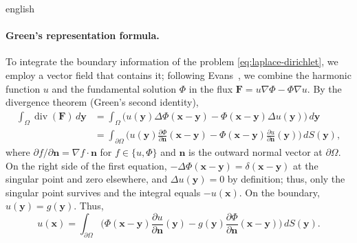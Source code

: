\documentclass[../0000.tex]{subfiles}
\begin{document}
\begin{hyphenrules}{english}
\paragraph{Green's representation formula.}
To integrate the boundary information of the problem \eqref{eq:laplace-dirichlet}, we employ a vector
field that contains
it; following Evans~\cite{evans2010}, we combine the harmonic function $u$ and the fundamental solution
$\Phi$ in the flux $\mathbf{F}=u\nabla\Phi-\Phi\nabla u$. By the divergence theorem (Green's second identity),
\begin{align}
  \int_\Omega\operatorname{div}(\mathbf{F})\,d\mathbf{y}
    &=\int_\Omega\big(u(\mathbf{y})\Delta\Phi(\mathbf{x}-\mathbf{y})-\Phi(\mathbf{x}-\mathbf{y})\Delta u(\mathbf{y})\big)\,d\mathbf{y} \label{eq:green2-a}\\
    &=\int_{\partial\Omega}\Big(u(\mathbf{y})\frac{\partial\Phi}{\partial\mathbf{n}}(\mathbf{x}-\mathbf{y})
      -\Phi(\mathbf{x}-\mathbf{y})\frac{\partial u}{\partial\mathbf{n}}(\mathbf{y})\Big)\,d S(\mathbf{y}), \label{eq:green2-b}
\end{align}
where $\partial f/\partial\mathbf{n}=\nabla f\cdot\mathbf{n}$ for $f\in\{u,\Phi\}$ and $\mathbf{n}$ is the outward normal vector
at $\partial\Omega$. On the right side of the first equation, $-\Delta\Phi(\mathbf{x}-\mathbf{y})=\delta(\mathbf{x}-\mathbf{y})$ at the
singular point and zero elsewhere, and $\Delta u(\mathbf{y})=0$ by definition; thus, only the singular point
survives and the integral equals $-u(\mathbf{x})$. On the boundary, $u(\mathbf{y})=g(\mathbf{y})$. Thus,
\begin{equation}
  u(\mathbf{x})=\int_{\partial\Omega}\Big(\Phi(\mathbf{x}-\mathbf{y})\frac{\partial u}{\partial\mathbf{n}}(\mathbf{y})
    -g(\mathbf{y})\frac{\partial\Phi}{\partial\mathbf{n}}(\mathbf{x}-\mathbf{y})\Big)\,d S(\mathbf{y}).
  \label{eq:laplace-rep}
\end{equation}


\end{hyphenrules}
\end{document}
